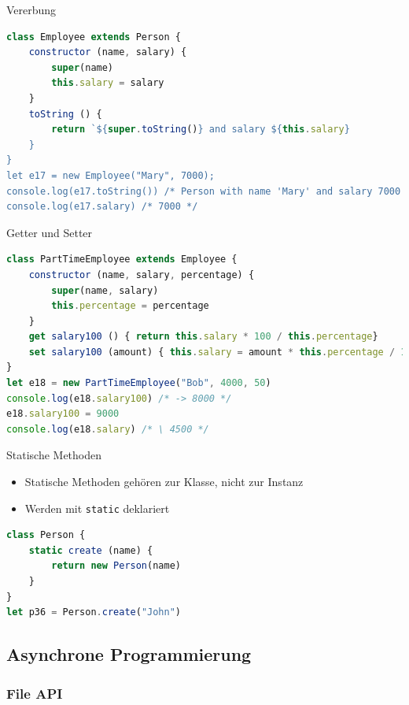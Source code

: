 \begin{code}{Vererbung}
\begin{lstlisting}[language=JavaScript, style=basesmol]
class Employee extends Person {
    constructor (name, salary) {
        super(name)
        this.salary = salary
    }
    toString () {
        return `${super.toString()} and salary ${this.salary}
    }
}
let e17 = new Employee("Mary", 7000);
console.log(e17.toString()) /* Person with name 'Mary' and salary 7000 */
console.log(e17.salary) /* 7000 */
\end{lstlisting}
\end{code}

\begin{examplecode}{Getter und Setter}
\begin{lstlisting}[language=JavaScript, style=basesmol]
class PartTimeEmployee extends Employee {
    constructor (name, salary, percentage) {
        super(name, salary)
        this.percentage = percentage
    }
    get salary100 () { return this.salary * 100 / this.percentage}
    set salary100 (amount) { this.salary = amount * this.percentage / 100 }
}
let e18 = new PartTimeEmployee("Bob", 4000, 50)
console.log(e18.salary100) /* -> 8000 */
e18.salary100 = 9000
console.log(e18.salary) /* \ 4500 */
\end{lstlisting}
\end{examplecode}

\begin{definition}{Statische Methoden}
    \begin{itemize}
        \item Statische Methoden gehören zur Klasse, nicht zur Instanz
        \item Werden mit \texttt{static} deklariert
    \end{itemize}

\begin{lstlisting}[language=JavaScript, style=basesmol]
class Person {
    static create (name) {
        return new Person(name)
    }
}
let p36 = Person.create("John")
\end{lstlisting}
\end{definition}

\pagebreak

\subsection{Asynchrone Programmierung}

\subsubsection{File API}

